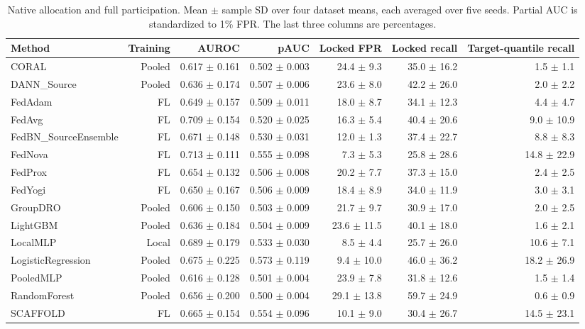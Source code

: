 \documentclass[journal,10pt]{IEEEtran}
\begin{document}
\begin{table}[t]\centering\small
\caption{Native allocation and full participation. Mean $\pm$ sample SD over four dataset means, each averaged over five seeds. Partial AUC is standardized to 1\% FPR. The last three columns are percentages.}\label{tab:primary}
\begin{tabular}{lrrrrrr}\toprule
Method & Training & AUROC & pAUC & Locked FPR & Locked recall & Target-quantile recall\\\midrule
CORAL & Pooled & 0.617 $\pm$ 0.161 & 0.502 $\pm$ 0.003 & 24.4 $\pm$ 9.3 & 35.0 $\pm$ 16.2 & 1.5 $\pm$ 1.1\\
DANN\_Source & Pooled & 0.636 $\pm$ 0.174 & 0.507 $\pm$ 0.006 & 23.6 $\pm$ 8.0 & 42.2 $\pm$ 26.0 & 2.0 $\pm$ 2.2\\
FedAdam & FL & 0.649 $\pm$ 0.157 & 0.509 $\pm$ 0.011 & 18.0 $\pm$ 8.7 & 34.1 $\pm$ 12.3 & 4.4 $\pm$ 4.7\\
FedAvg & FL & 0.709 $\pm$ 0.154 & 0.520 $\pm$ 0.025 & 16.3 $\pm$ 5.4 & 40.4 $\pm$ 20.6 & 9.0 $\pm$ 10.9\\
FedBN\_SourceEnsemble & FL & 0.671 $\pm$ 0.148 & 0.530 $\pm$ 0.031 & 12.0 $\pm$ 1.3 & 37.4 $\pm$ 22.7 & 8.8 $\pm$ 8.3\\
FedNova & FL & 0.713 $\pm$ 0.111 & 0.555 $\pm$ 0.098 & 7.3 $\pm$ 5.3 & 25.8 $\pm$ 28.6 & 14.8 $\pm$ 22.9\\
FedProx & FL & 0.654 $\pm$ 0.132 & 0.506 $\pm$ 0.008 & 20.2 $\pm$ 7.7 & 37.3 $\pm$ 15.0 & 2.4 $\pm$ 2.5\\
FedYogi & FL & 0.650 $\pm$ 0.167 & 0.506 $\pm$ 0.009 & 18.4 $\pm$ 8.9 & 34.0 $\pm$ 11.9 & 3.0 $\pm$ 3.1\\
GroupDRO & Pooled & 0.606 $\pm$ 0.150 & 0.503 $\pm$ 0.009 & 21.7 $\pm$ 9.7 & 30.9 $\pm$ 17.0 & 2.0 $\pm$ 2.5\\
LightGBM & Pooled & 0.636 $\pm$ 0.184 & 0.504 $\pm$ 0.009 & 23.6 $\pm$ 11.5 & 40.1 $\pm$ 18.0 & 1.6 $\pm$ 2.1\\
LocalMLP & Local & 0.689 $\pm$ 0.179 & 0.533 $\pm$ 0.030 & 8.5 $\pm$ 4.4 & 25.7 $\pm$ 26.0 & 10.6 $\pm$ 7.1\\
LogisticRegression & Pooled & 0.675 $\pm$ 0.225 & 0.573 $\pm$ 0.119 & 9.4 $\pm$ 10.0 & 46.0 $\pm$ 36.2 & 18.2 $\pm$ 26.9\\
PooledMLP & Pooled & 0.616 $\pm$ 0.128 & 0.501 $\pm$ 0.004 & 23.9 $\pm$ 7.8 & 31.8 $\pm$ 12.6 & 1.5 $\pm$ 1.4\\
RandomForest & Pooled & 0.656 $\pm$ 0.200 & 0.500 $\pm$ 0.004 & 29.1 $\pm$ 13.8 & 59.7 $\pm$ 24.9 & 0.6 $\pm$ 0.9\\
SCAFFOLD & FL & 0.665 $\pm$ 0.154 & 0.554 $\pm$ 0.096 & 10.1 $\pm$ 9.0 & 30.4 $\pm$ 26.7 & 14.5 $\pm$ 23.1\\
\bottomrule\end{tabular}\end{table}
\end{document}
